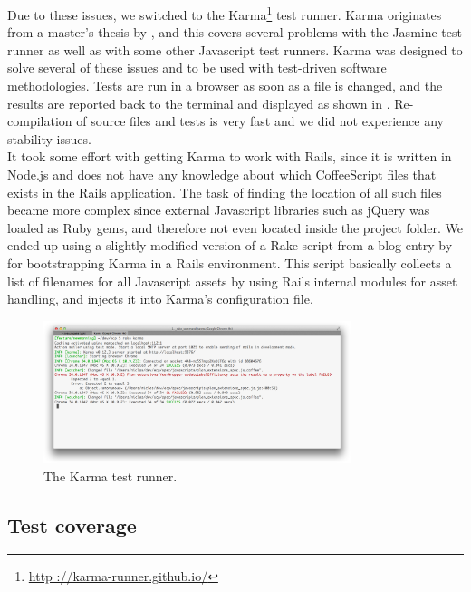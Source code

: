 Due to these issues, we switched to the Karma\footnote{\url{http
://karma-runner.github.io/}} test runner. Karma originates from a
master's thesis by \citet{article:karma}, and this covers several
problems with the Jasmine test runner as well as with some other
Javascript test runners. Karma was designed to solve several of these
issues and to be used with test-driven software methodologies. Tests are
run in a browser as soon as a file is changed, and the results are
reported back to the terminal and displayed as shown in
. Re-compilation of source files and tests is
very fast and we did not experience any stability issues.\\

It took some effort with getting Karma to work with Rails, since it is
written in Node.js and does not have any knowledge about which
CoffeeScript files that exists in the Rails application. The task of
finding the location of all such files became more complex since
external Javascript libraries such as jQuery was loaded as Ruby gems,
and therefore not even located inside the project folder. We ended up
using a slightly modified version of a Rake script from a blog entry by
\citet{web:saunier_angular} for bootstrapping Karma in a Rails
environment. This script basically collects a list of filenames for all
Javascript assets by using Rails internal modules for asset handling,
and injects it into Karma's configuration file.\\

\begin{figure}
\centering
\includegraphics[width=0.8\textwidth]{results/choices/karma_runner}
\caption{The Karma test runner.}
\label{fig:karma_runner}
\end{figure}


\subsection{Test coverage}
\label{sec:coverage_frameworks}

